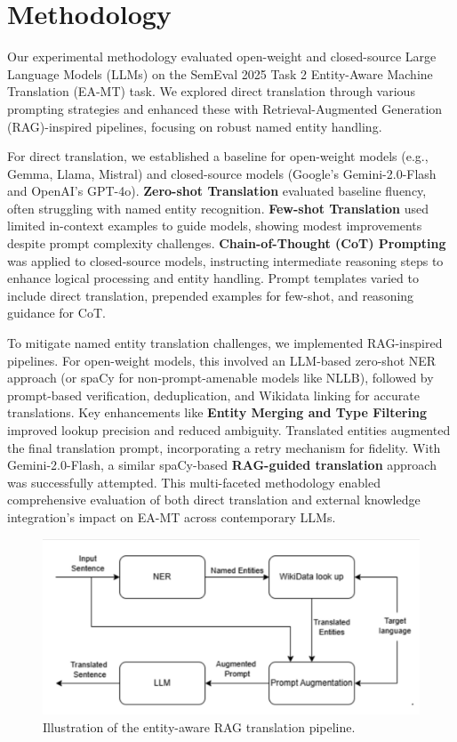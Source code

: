\documentclass{ecai}
\begin{document}
\section{Methodology}
\label{sec:methodology}
Our experimental methodology evaluated open-weight and closed-source Large Language Models (LLMs) on the SemEval 2025 Task 2 Entity-Aware Machine Translation (EA-MT) task. 
We explored direct translation through various prompting strategies and enhanced these with Retrieval-Augmented Generation (RAG)-inspired pipelines, focusing on robust named entity handling.

For direct translation, we established a baseline for open-weight models (e.g., Gemma, Llama, Mistral) and closed-source models (Google's Gemini-2.0-Flash and OpenAI's GPT-4o). 
\textbf{Zero-shot Translation} evaluated baseline fluency, often struggling with named entity recognition. \textbf{Few-shot Translation} used limited in-context examples to guide models, 
showing modest improvements despite prompt complexity challenges. \textbf{Chain-of-Thought (CoT) Prompting} was applied to closed-source models, instructing intermediate reasoning 
steps to enhance logical processing and entity handling. Prompt templates varied to include direct translation, prepended examples for few-shot, and reasoning guidance for CoT.

To mitigate named entity translation challenges, we implemented RAG-inspired pipelines. For open-weight models, this involved an LLM-based zero-shot NER approach 
(or spaCy for non-prompt-amenable models like NLLB), followed by prompt-based verification, deduplication, and Wikidata linking for accurate translations.
Key enhancements like \textbf{Entity Merging and Type Filtering} improved lookup precision and reduced ambiguity. Translated entities augmented 
the final translation prompt, incorporating a retry mechanism for fidelity. With Gemini-2.0-Flash, a similar spaCy-based \textbf{RAG-guided translation} approach 
was successfully attempted. This multi-faceted methodology enabled comprehensive evaluation of both direct translation and external knowledge 
integration's impact on EA-MT across contemporary LLMs.

\begin{figure}[h!]
    \centering
    \includegraphics[width=1.0\linewidth]{rag.png}
    \caption{Illustration of the entity-aware RAG translation pipeline.}
    \label{fig:entity_pipeline}
\end{figure}
\end{document}
